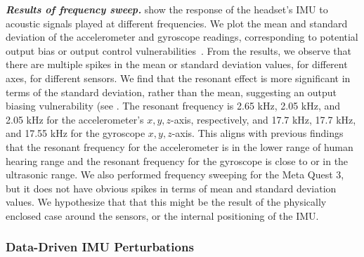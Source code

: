 \textbf{\emph{Results of frequency sweep.}}
 show the response of the headset's IMU to acoustic signals played at different frequencies.
We plot the mean and standard deviation of the accelerometer and gyroscope readings, corresponding to potential output bias or output control vulnerabilities~\cite{trippel2017walnut}.
From the results, we observe that there are multiple spikes in the mean or standard deviation values, for different axes, for different sensors. 
We find that the resonant effect is more significant in terms of the standard deviation, rather than the mean, suggesting an output biasing vulnerability (see .
The resonant frequency is 2.65 kHz, 2.05 kHz, and 2.05 kHz for the accelerometer's $x,y,z$-axis, respectively, and 17.7 kHz, 17.7 kHz, and 17.55 kHz for the gyroscope $x,y,z$-axis.
This aligns with previous findings \cite{jeong2023rocking} that the resonant frequency for the accelerometer is in the lower range of human hearing range and the resonant frequency for the gyroscope is close to or in the ultrasonic range.
We also performed frequency sweeping for the Meta Quest 3,  but it does not have obvious spikes in terms of mean and standard deviation values. We hypothesize that that this might be the result of the physically enclosed case around the sensors, or the internal positioning of the IMU.




\subsubsection{Data-Driven IMU Perturbations} 
\label{subsubsec:orb-slam gmm}

